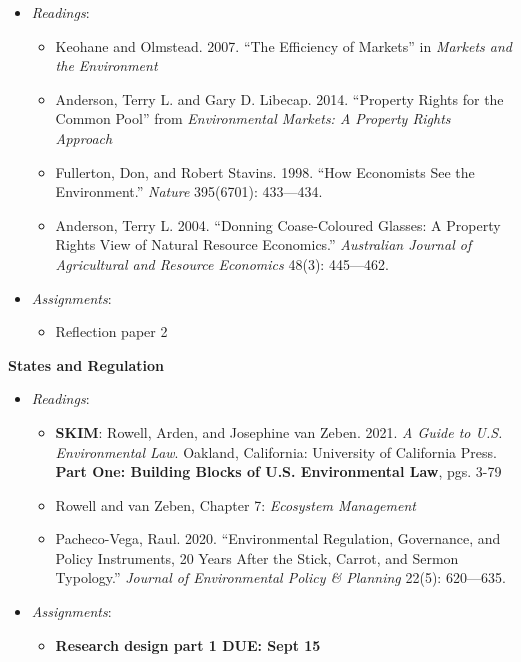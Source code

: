 \begin{itemize}

\item
  \emph{Readings}:

  \begin{itemize}
  
  \item
    Keohane and Olmstead. 2007. ``The Efficiency of Markets'' in
    \emph{Markets and the Environment}
  \item
    Anderson, Terry L. and Gary D. Libecap. 2014. ``Property Rights for
    the Common Pool'' from \emph{Environmental Markets: A Property
    Rights Approach}
  \item
    Fullerton, Don, and Robert Stavins. 1998. ``How Economists See the
    Environment.'' \emph{Nature} 395(6701): 433---434.
  \item
    Anderson, Terry L. 2004. ``Donning Coase-Coloured Glasses: A
    Property Rights View of Natural Resource Economics.''
    \emph{Australian Journal of Agricultural and Resource Economics}
    48(3): 445---462.
  \end{itemize}
\item
  \emph{Assignments}:

  \begin{itemize}
  
  \item
    Reflection paper 2
  \end{itemize}
\end{itemize}

\week \textbf{States and Regulation}

\begin{itemize}

\item
  \emph{Readings}:

  \begin{itemize}
  
  \item
    \textbf{SKIM}: Rowell, Arden, and Josephine van Zeben. 2021. \emph{A
    Guide to U.S. Environmental Law}. Oakland, California: University of
    California Press. \textbf{Part One: Building Blocks of U.S.
    Environmental Law}, pgs. 3-79
  \item
    Rowell and van Zeben, Chapter 7: \emph{Ecosystem Management}
  \item
    Pacheco-Vega, Raul. 2020. ``Environmental Regulation, Governance,
    and Policy Instruments, 20 Years After the Stick, Carrot, and Sermon
    Typology.'' \emph{Journal of Environmental Policy \& Planning}
    22(5): 620---635.
  \end{itemize}
\item
  \emph{Assignments}:

  \begin{itemize}
  
  \item
    \textbf{Research design part 1 DUE: Sept 15}
  \end{itemize}
\end{itemize}

